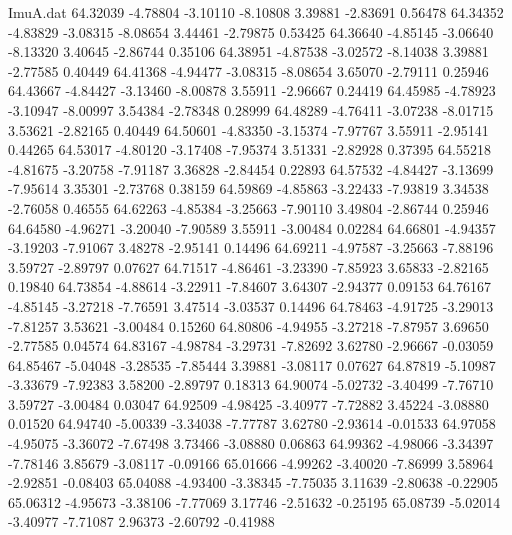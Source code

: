 \begin{filecontents}{ImuA.dat}
  64.32039   -4.78804   -3.10110   -8.10808    3.39881   -2.83691    0.56478
  64.34352   -4.83829   -3.08315   -8.08654    3.44461   -2.79875    0.53425
  64.36640   -4.85145   -3.06640   -8.13320    3.40645   -2.86744    0.35106
  64.38951   -4.87538   -3.02572   -8.14038    3.39881   -2.77585    0.40449
  64.41368   -4.94477   -3.08315   -8.08654    3.65070   -2.79111    0.25946
  64.43667   -4.84427   -3.13460   -8.00878    3.55911   -2.96667    0.24419
  64.45985   -4.78923   -3.10947   -8.00997    3.54384   -2.78348    0.28999
  64.48289   -4.76411   -3.07238   -8.01715    3.53621   -2.82165    0.40449
  64.50601   -4.83350   -3.15374   -7.97767    3.55911   -2.95141    0.44265
  64.53017   -4.80120   -3.17408   -7.95374    3.51331   -2.82928    0.37395
  64.55218   -4.81675   -3.20758   -7.91187    3.36828   -2.84454    0.22893
  64.57532   -4.84427   -3.13699   -7.95614    3.35301   -2.73768    0.38159
  64.59869   -4.85863   -3.22433   -7.93819    3.34538   -2.76058    0.46555
  64.62263   -4.85384   -3.25663   -7.90110    3.49804   -2.86744    0.25946
  64.64580   -4.96271   -3.20040   -7.90589    3.55911   -3.00484    0.02284
  64.66801   -4.94357   -3.19203   -7.91067    3.48278   -2.95141    0.14496
  64.69211   -4.97587   -3.25663   -7.88196    3.59727   -2.89797    0.07627
  64.71517   -4.86461   -3.23390   -7.85923    3.65833   -2.82165    0.19840
  64.73854   -4.88614   -3.22911   -7.84607    3.64307   -2.94377    0.09153
  64.76167   -4.85145   -3.27218   -7.76591    3.47514   -3.03537    0.14496
  64.78463   -4.91725   -3.29013   -7.81257    3.53621   -3.00484    0.15260
  64.80806   -4.94955   -3.27218   -7.87957    3.69650   -2.77585    0.04574
  64.83167   -4.98784   -3.29731   -7.82692    3.62780   -2.96667   -0.03059
  64.85467   -5.04048   -3.28535   -7.85444    3.39881   -3.08117    0.07627
  64.87819   -5.10987   -3.33679   -7.92383    3.58200   -2.89797    0.18313
  64.90074   -5.02732   -3.40499   -7.76710    3.59727   -3.00484    0.03047
  64.92509   -4.98425   -3.40977   -7.72882    3.45224   -3.08880    0.01520
  64.94740   -5.00339   -3.34038   -7.77787    3.62780   -2.93614   -0.01533
  64.97058   -4.95075   -3.36072   -7.67498    3.73466   -3.08880    0.06863
  64.99362   -4.98066   -3.34397   -7.78146    3.85679   -3.08117   -0.09166
  65.01666   -4.99262   -3.40020   -7.86999    3.58964   -2.92851   -0.08403
  65.04088   -4.93400   -3.38345   -7.75035    3.11639   -2.80638   -0.22905
  65.06312   -4.95673   -3.38106   -7.77069    3.17746   -2.51632   -0.25195
  65.08739   -5.02014   -3.40977   -7.71087    2.96373   -2.60792   -0.41988

\end{filecontents}
